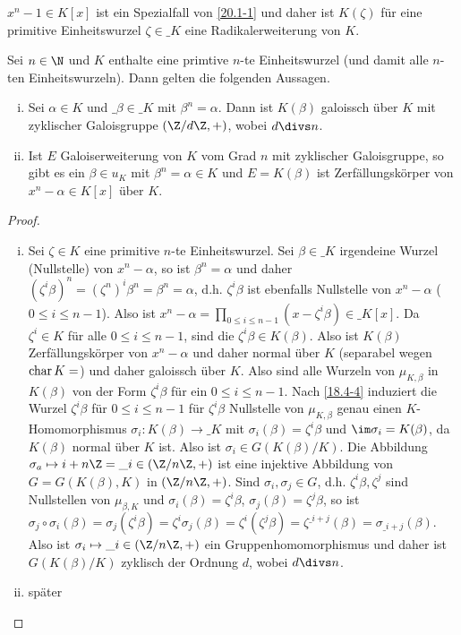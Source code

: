\begin{nt} \label{20.2-2}
	$x^n - 1 \in K[x]$ ist ein Spezialfall von \ref{20.1-1} und daher ist $K(\zeta)$ für eine primitive Einheitswurzel $\zeta \in \_K$ eine Radikalerweiterung von $K$.
\end{nt}

\begin{st} \label{20.2-3}
	Sei $n \in \N$ und $K$ enthalte eine primtive $n$-te Einheitswurzel (und damit alle $n$-ten Einheitswurzeln).
	Dann gelten die folgenden Aussagen.
	\begin{enumerate}[i)]
		\item
			Sei $\alpha \in K$ und $\_\beta \in \_K$ mit $\beta^n = \alpha$.
			Dann ist $K(\beta)$ galoissch über $K$ mit zyklischer Galoisgruppe $(\Z / d \Z, +)$, wobei $d \divs n$.
		\item
			Ist $E$ Galoiserweiterung von $K$ vom Grad $n$ mit zyklischer Galoisgruppe, so gibt es ein $\beta \in u_K$ mit $\beta^n = \alpha \in K$ und $E = K(\beta)$ ist Zerfällungskörper von $x^n - \alpha \in K[x]$ über $K$.
	\end{enumerate}
	\begin{proof}
		\begin{enumerate}[i)]
			\item
				Sei $\zeta \in K$ eine primitive $n$-te Einheitswurzel.
				Sei $\beta \in \_K$ irgendeine Wurzel (Nullstelle) von $x^n - \alpha$, so ist $\beta^n = \alpha$ und daher $(\zeta^i \beta)^n = (\zeta^n)^i \beta^n = \beta^n = \alpha$, d.h. $\zeta^i \beta$ ist ebenfalls Nullstelle von $x^n - \alpha$ ($0 \le i \le n-1$).
				Also ist $x^n - \alpha = \prod_{0\le i \le n-1} (x - \zeta^i \beta) \in \_K[x]$.
				Da $\zeta^i \in K$ für alle $0\le i \le n-1$, sind die $\zeta^i \beta \in K(\beta)$.
				Also ist $K(\beta)$ Zerfällungskörper von $x^n - \alpha$ und daher normal über $K$ (separabel wegen $\operatorname{char} K = $) und daher galoissch über $K$.
				Also sind alle Wurzeln von $\mu_{K, \beta}$ in $K(\beta)$ von der Form $\zeta^i \beta$ für ein $0 \le i \le n -1$.
				Nach \ref{18.4-4} induziert die Wurzel $\zeta^i \beta$ für $0 \le i \le n-1$ für $\zeta^i \beta$ Nullstelle von $\mu_{K, \beta}$ genau einen $K$-Homomorphismus $\sigma_i: K(\beta) \to \_K$ mit $\sigma_i(\beta) = \zeta^i \beta$ und $\im \sigma_i = K(\beta)$, da $K(\beta)$ normal über $K$ ist.
				Also ist $\sigma_i \in G(K(\beta) / K)$.
				Die Abbildung $\sigma_a \mapsto i + n \Z = \_i \in (\Z / n\Z, +)$ ist eine injektive Abbildung von $G = G(K(\beta), K)$ in $(\Z / n\Z, + )$.
				Sind $\sigma_i, \sigma_j \in G$, d.h. $\zeta^i \beta, \zeta^j$ sind Nullstellen von $\mu_{\beta,K}$ und $\sigma_i(\beta) = \zeta^i \beta$, $\sigma_j(\beta) = \zeta^j \beta$, so ist $\sigma_j \circ \sigma_i(\beta) = \sigma_j(\zeta^i \beta) = \zeta^i \sigma_j(\beta) = \zeta^i(\zeta^j \beta) = \zeta^{\_{i+j}}(\beta) = \sigma_{\_{i+j}}(\beta)$.
				Also ist $\sigma_i \mapsto \_i \in (\Z / n \Z, +)$ ein Gruppenhomomorphismus und daher ist $G(K(\beta) / K)$ zyklisch der Ordnung $d$, wobei $d \divs n$.
			\item
				später
		\end{enumerate}
	\end{proof}
\end{st}

